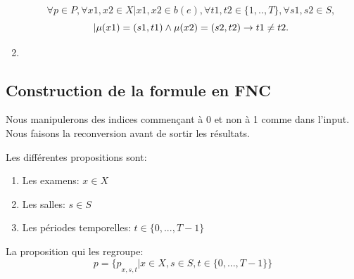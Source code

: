 \documentclass[a4paper,10pt]{article}
\begin{document}
\begin{enumerate}
{\begin{minipage}{1.0\textwidth}
\begin{equation}
\forall p \in P,\forall x1,x2 \in X | x1,x2 \in b(e), \forall t1,t2 \in \{1,..,T\}, \forall s1,s2 \in S, 
\end{equation}
\begin{equation}
 | \mu(x1) = (s1,t1) \land \mu(x2) = (s2,t2) \rightarrow  t1 \neq t2.  \\
\end{equation}
\end{minipage}}
\item
{}
\end{enumerate}
\subsection{Construction de la formule en FNC}
Nous manipulerons des indices commençant à 0 et non à 1 comme dans l'input. Nous faisons la reconversion avant de sortir les résultats.

Les différentes propositions sont:
\begin{enumerate}
\item
Les examens: $x \in X$
\item
Les salles: $s \in S$
\item
Les périodes temporelles: $t \in \{0,...,T-1\}$
\end{enumerate}

La proposition qui les regroupe:
\begin{equation}
p = \{ p \underset{x,s,t}{} | x \in X, s \in S, t \in \{0,...,T-1\} \}
\end{equation} 
\end{document}
